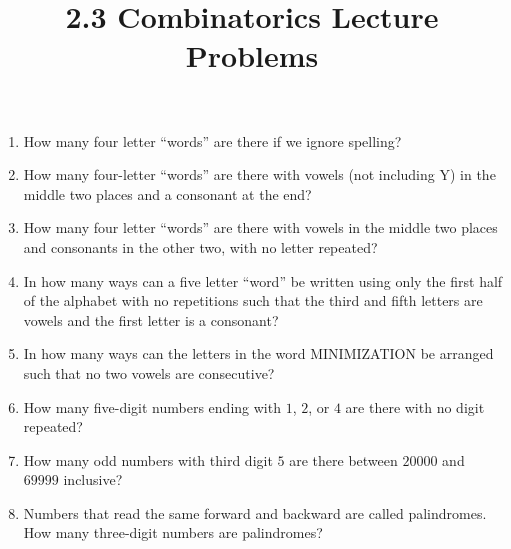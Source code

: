 \documentclass{article}
\title{2.3 Combinatorics Lecture Problems}
\author{}
\date{}
\begin{document}
\maketitle

\begin{enumerate}
	\item How many four letter ``words'' are there if we ignore spelling?
		\vspace{3cm}
	\item How many four-letter ``words'' are there with vowels (not including Y) 
		in the middle two places and a consonant at the end?
		\vspace{3cm}
	\item How many four letter ``words'' are there with vowels in the middle two 
		places and consonants in the other two, with no letter repeated?
		\vspace{3cm}
    \item In how many ways can a five letter ``word'' be written using only the 
        first half of the alphabet with no repetitions such that the third and 
        fifth letters are vowels and the first letter is a consonant?
		\vspace{3cm}
    \item In how many ways can the letters in the word MINIMIZATION be arranged 
        such that no two vowels are consecutive?
		\vspace{3cm}
    \item How many five-digit numbers ending with $1$, $2$, or $4$ are there 
        with no digit repeated?
        \vspace{3cm}
    \item How many odd numbers with third digit $5$ are there between $20000$ 
		and $69999$ inclusive?
		\vspace{3cm}
    \item Numbers that read the same forward and backward are called 
        palindromes. How many three-digit numbers are palindromes?
\end{enumerate}
\end{document}
